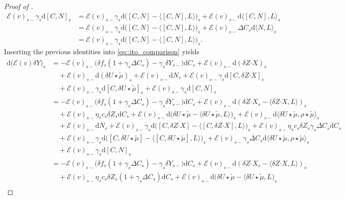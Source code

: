 \documentclass[10pt]{article} %
\newcommand\cE{\mathcal E}
\newcommand{\bcdot}{\boldsymbol{\cdot}}
\def\d{\mathrm{d}}
\begin{document}
\begin{proof}[Proof of ]
\begin{align*}
		\cE(v)_{s-}\gamma_s \d [C,N]_s 
		&= \cE(v)_{s-}\gamma_s \d \big([C,N] - \big\langle [C,N],L\big\rangle \big)_s + \cE(v)_{s-}\d\big\langle [C,N],L\big\rangle_s \\
		&= \cE(v)_{s-}\gamma_s \d \big([C,N] - \big\langle [C,N],L\big\rangle \big)_s + \cE(v)_{s-}\Delta C_s\d\big\langle N,L\big\rangle_s \\
		&= \cE(v)_{s-}\gamma_s \d \big([C,N] - \big\langle [C,N],L\big\rangle \big)_s.
	\end{align*}
	Inserting the previous identities into \eqref{eq::ito_comparison} yields
	\begin{align}\label{eq::ito_comparison2}
		\d \big(\cE(v)\delta Y\big)_s 
		&= - \cE(v)_{s-} \big(\delta f_s(1+\gamma_s\Delta C_s) - \gamma_s\delta Y_{s-}\big)\d C_s + \cE(v)_{s-} \d(\delta Z \bcdot X)_s \nonumber\\
		&\quad + \cE(v)_{s-}\d (\delta U \star\tilde\mu)_s + \cE(v)_{s-}\d N_s +\cE(v)_{s-}\gamma_s \d [C,\delta Z \bcdot X]_s \nonumber\\
		&\quad + \cE(v)_{s-}\gamma_s \d [C,\delta U \star\tilde\mu]_s + \cE(v)_{s-}\gamma_s \d [C,N]_s \nonumber\\
		&= - \cE(v)_{s-} \big(\delta f_s(1+\gamma_s\Delta C_s) - \gamma_s\delta Y_{s-}\big)\d C_s + \cE(v)_{s-}\d (\delta Z \bcdot X_s - \langle \delta Z \bcdot X,L \rangle)_s \nonumber\\
		&\quad + \cE(v)_{s-} \eta_s c_s\delta Z_s \d C_s + \cE(v)_{s-}\d\big(\delta U \star \tilde\mu - \langle \delta U \star\tilde\mu,L\rangle\big)_s + \cE(v)_{s-}\d \langle \delta U \star\tilde\mu,\rho\star\tilde\mu\rangle_s \nonumber\\
		&\quad + \cE(v)_{s-}\d N_s + \cE(v)_{s-}\gamma_s \d\big([C,\delta Z \bcdot X]-\big\langle [C,\delta Z \bcdot X],L \big\rangle\big)_s + \cE(v)_{s-}\eta_s c_s \delta Z_s \gamma_s \Delta C_s \d C_s \nonumber\\
		&\quad + \cE(v)_{s-}\gamma_s \d\big([C,\delta U \star\tilde\mu]-\big\langle [C,\delta U \star\tilde\mu],L \big\rangle\big)_s + \cE(v)_{s-}\gamma_s \Delta C_s \d\langle \delta U \star\tilde\mu,\rho\star\tilde\mu \rangle_s \nonumber\\
		&\quad + \cE(v)_{s-}\gamma_s \d [C,N]_s \nonumber\\
		&= -  \cE(v)_{s-} \big(\delta f_s(1+\gamma_s\Delta C_s) - \gamma_s\delta Y_{s-}\big)\d C_s + \cE(v)_{s-}\d (\delta Z \bcdot X_s - \langle \delta Z \bcdot X,L \rangle)_s \nonumber\\
		&\quad + \cE(v)_{s-} \eta_s c_s\delta Z_s (1+\gamma_s\Delta C_s) \d C_s + \cE(v)_{s-}\d\big(\delta U \star \tilde\mu - \langle \delta U \star\tilde\mu,L\big)_s \nonumber\\

\end{align}
\end{proof}
\end{document}
